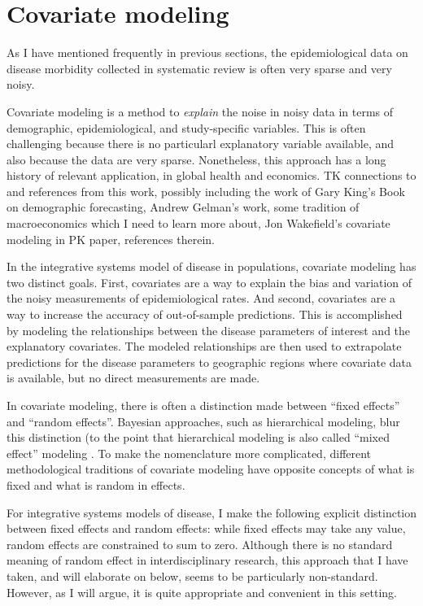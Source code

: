 \chapter{Covariate modeling}

As I have mentioned frequently in previous sections, the
epidemiological data on disease morbidity collected in systematic
review is often very sparse and very noisy.

Covariate modeling is a method to \emph{explain} the noise in noisy
data in terms of demographic, epidemiological, and study-specific
variables.  This is often challenging because there is no particularl
explanatory variable available, and also because the data are very
sparse.  Nonetheless, this approach has a long history of relevant
application, in global health and
economics. \cite{Girosi_Demographic_2008,Wakefield_Bayesian_1996} TK
connections to and references from this work, possibly including the
work of Gary King's Book on demographic forecasting, Andrew
Gelman's work, some tradition of macroeconomics which I need to learn
more about, Jon Wakefield's covariate modeling in PK paper,
references therein.

In the integrative systems model of disease in populations, covariate
modeling has two distinct goals.  First, covariates are a way to
explain the bias and variation of the noisy measurements of
epidemiological rates.  And second, covariates are a way to increase
the accuracy of out-of-sample predictions.  This is accomplished by
modeling the relationships between the disease parameters of interest
and the explanatory covariates. The modeled relationships are then
used to extrapolate predictions for the disease parameters to
geographic regions where covariate data is available, but no direct
measurements are made.

In covariate modeling, there is often a distinction made between
``fixed effects'' and ``random effects''.  Bayesian approaches, such
as hierarchical modeling, blur this distinction (to the point that
hierarchical modeling is also called ``mixed effect'' modeling
\cite{Gelman_Multilevel_2005}.  To make the nomenclature more
complicated, different methodological traditions of covariate modeling
have opposite concepts of what is fixed and what is random in effects.

For integrative systems models of disease, I make the following
explicit distinction between fixed effects and random effects: while
fixed effects may take any value, random effects are constrained to
sum to zero.  Although there is no standard meaning of random effect
in interdisciplinary research, this approach that I have taken, and
will elaborate on below, seems to be particularly non-standard.
However, as I will argue, it is quite appropriate and convenient in
this setting.

